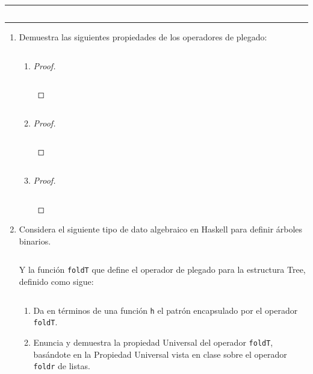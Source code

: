\documentclass[11pt,letterpaper]{article}
\newcommand{\code}[1]{\textcolor{WildStrawberry}{\texttt{#1}}}
\begin{document}
\inputminted{haskell}{assets/def-foldl.hs}

\noindent
{\color{WildStrawberry} \rule{\linewidth}{0.4mm} }

\inputminted{haskell}{assets/def-reverse.hs}

\noindent
{\color{WildStrawberry} \rule{\linewidth}{0.4mm} }

\begin{enumerate}
\item Demuestra las siguientes propiedades de los operadores de plegado:

\begin{enumerate}[label=\alph*)]
    \item \inputminted{haskell}{assets/1-a.hs}
    \begin{proof}
        \hfill
        \inputminted{haskell}{assets/1-a-proof.hs}
    \end{proof}

    \item \inputminted{haskell}{assets/1-b.hs}
    \begin{proof}
        \hfill
        \inputminted{haskell}{assets/1-b-proof.hs}
    \end{proof}

    \item \inputminted{haskell}{assets/1-c.hs}
    \begin{proof}
        \hfill
        \inputminted{haskell}{assets/1-c-proof.hs}
    \end{proof}
\end{enumerate}

\item Considera el siguiente tipo de dato algebraico en Haskell para definir árboles binarios.

\inputminted{haskell}{assets/2-1.hs}

Y la función \texttt{foldT} que define el operador de plegado para la estructura Tree, definido como sigue:

\inputminted{haskell}{assets/2-2.hs}

\begin{enumerate}[label=\alph*)]
    \item Da en términos de una función \code{h} el patrón encapsulado por el operador \code{foldT}.
    

    \item Enuncia y demuestra la propiedad Universal del operador \code{foldT}, basándote en la
    Propiedad Universal vista en clase sobre el operador \code{foldr} de listas.


\end{enumerate}
\end{enumerate}
\end{document}
